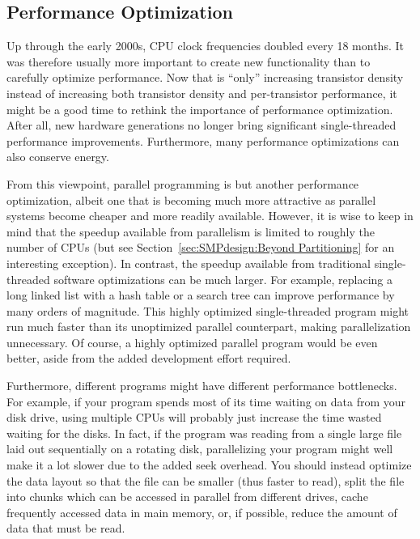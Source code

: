 \subsection{Performance Optimization}
\label{sec:intro:Performance Optimization}

Up through the early 2000s, CPU clock frequencies doubled every 18 months.
It was therefore usually more important to create new functionality than to
carefully optimize performance.
Now that  is ``only'' increasing transistor density instead
of increasing both transistor density and per-transistor performance,
it might be a good time to rethink the importance of performance
optimization.
After all, new hardware generations no longer bring significant
single-threaded performance improvements.
Furthermore, many performance optimizations can also conserve energy.

From this viewpoint, parallel programming is but another performance
optimization, albeit one that is becoming much more attractive
as parallel systems become cheaper and more readily available.
However, it is wise to keep in mind that the speedup available from
parallelism is limited to roughly the number of CPUs
(but see Section~\ref{sec:SMPdesign:Beyond Partitioning}
for an interesting exception).
In contrast, the speedup available from traditional single-threaded
software optimizations can be much larger.
For example, replacing a long linked list with a hash table
or a search tree can improve performance by many orders of magnitude.
This highly optimized single-threaded program might run much
faster than its unoptimized parallel counterpart, making parallelization
unnecessary.
Of course, a highly optimized parallel program would be even better,
aside from the added development effort required.

Furthermore, different programs might have different performance
bottlenecks.
For example, if your program spends most of its time
waiting on data from your disk drive,
using multiple CPUs will probably just increase the time wasted waiting
for the disks.
In fact, if the program was reading from a single large file laid out
sequentially on a rotating disk, parallelizing your program might
well make it a lot slower due to the added seek overhead.
You should instead optimize the data layout so that
the file can be smaller (thus faster to read), split the file into chunks
which can be accessed in parallel from different drives,
cache frequently accessed data in main memory,
or, if possible,
reduce the amount of data that must be read.

